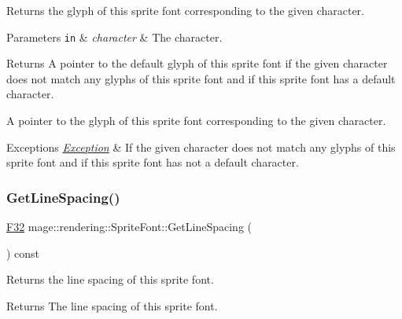 Returns the glyph of this sprite font corresponding to the given character.


\begin{DoxyParams}[1]{Parameters}
\mbox{\tt in}  & {\em character} & The character. \\
\hline
\end{DoxyParams}
\begin{DoxyReturn}{Returns}
A pointer to the default glyph of this sprite font if the given character does not match any glyphs of this sprite font and if this sprite font has a default character. 

A pointer to the glyph of this sprite font corresponding to the given character. 
\end{DoxyReturn}

\begin{DoxyExceptions}{Exceptions}
{\em \hyperlink{classmage_1_1_exception}{Exception}} & If the given character does not match any glyphs of this sprite font and if this sprite font has not a default character. \\
\hline
\end{DoxyExceptions}
\hypertarget{classmage_1_1rendering_1_1_sprite_font_af8a9229b449007440733cdd65d65b2f5}{}\label{classmage_1_1rendering_1_1_sprite_font_af8a9229b449007440733cdd65d65b2f5} 
\subsubsection{\texorpdfstring{Get\+Line\+Spacing()}{GetLineSpacing()}}
{\footnotesize\ttfamily \hyperlink{namespacemage_aa97e833b45f06d60a0a9c4fc22ae02c0}{F32} mage\+::rendering\+::\+Sprite\+Font\+::\+Get\+Line\+Spacing (\begin{DoxyParamCaption}{ }\end{DoxyParamCaption}) const\hspace{0.3cm}{\ttfamily [noexcept]}}

Returns the line spacing of this sprite font.

\begin{DoxyReturn}{Returns}
The line spacing of this sprite font. 
\end{DoxyReturn}
\hypertarget{classmage_1_1rendering_1_1_sprite_font_a832f140b987c30ef8f6a3b95afe52711}{}\label{classmage_1_1rendering_1_1_sprite_font_a832f140b987c30ef8f6a3b95afe52711} 
